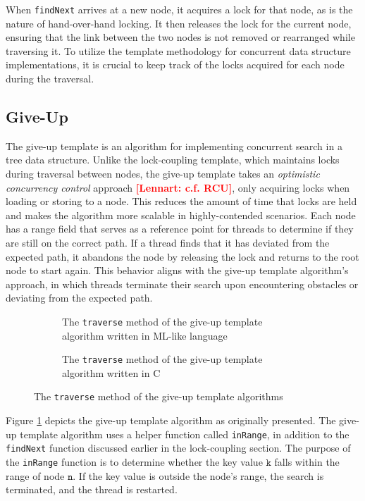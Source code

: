 \documentclass[a4paper,UKenglish,cleveref, autoref, thm-restate]{lipics-v2021}
\newcommand{\lb}[1]{\textbf{\textcolor{red}{[Lennart: #1]}}}
\begin{document}
When \lstinline{findNext} arrives at a new node, it acquires a lock for that node, as is the nature of hand-over-hand locking. It then releases the lock for the current node, ensuring that the link between the two nodes is not removed or rearranged while traversing it. To utilize the template methodology for concurrent data structure implementations, it is crucial to keep track of the locks acquired for each node during the traversal. 

\subsection{Give-Up}
The give-up template is an algorithm for implementing concurrent search in a tree data structure. Unlike the lock-coupling template, which maintains locks during traversal between nodes, the give-up template takes an \emph{optimistic concurrency control} approach \lb{c.f. RCU}, only acquiring locks when loading or storing to a node. This reduces the amount of time that locks are held and makes the algorithm more scalable in highly-contended scenarios. Each node has a range field that serves as a reference point for threads to determine if they are still on the correct path. If a thread finds that it has deviated from the expected path, it abandons the node by releasing the lock and returns to the root node to start again. This behavior aligns with the give-up template algorithm's approach, in which threads terminate their search upon encountering obstacles or deviating from the expected path.

\begin{figure}[!ht]
	\begin{subfigure}[t]{0.45\textwidth}
		 
		\caption{The \lstinline{traverse} method of the give-up template algorithm written in ML-like language}
		\label{traverse_giveup_a}	
	\end{subfigure}\qquad
	\begin{subfigure}[t]{0.48\textwidth}
		 
		\caption{The \lstinline{traverse} method of the give-up template algorithm written in C}
		\label{traverse_giveup_b}
	\end{subfigure}
	\caption{The \lstinline{traverse} method of the give-up template algorithms}
	\label{traverse_giveup}
\end{figure}

Figure \ref{traverse_giveup_a} depicts the give-up template algorithm as originally presented. The give-up template algorithm uses a helper function called \lstinline{inRange}, in addition to the \lstinline{findNext} function discussed earlier in the lock-coupling section. The purpose of the \lstinline{inRange} function is to determine whether the key value $\texttt{k}$ falls within the range of node $\texttt{n}$. If the key value is outside the node's range, the search is terminated, and the thread is restarted.
\end{document}
